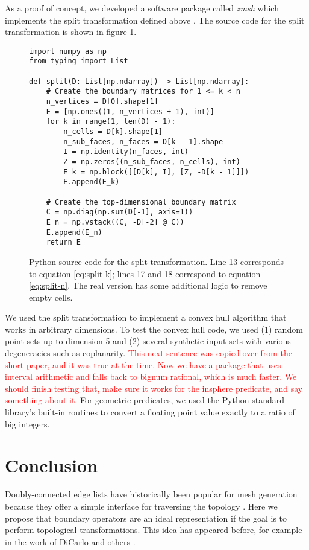 \documentclass[twocolumn]{article}
\begin{document}
As a proof of concept, we developed a software package called \emph{zmsh} which implements the split transformation defined above \cite{shapero2023zmsh}.
The source code for the split transformation is shown in figure \ref{fig:split-source-code}.
\begin{figure}
    \begin{verbatim}
import numpy as np
from typing import List

def split(D: List[np.ndarray]) -> List[np.ndarray]:
    # Create the boundary matrices for 1 <= k < n
    n_vertices = D[0].shape[1]
    E = [np.ones((1, n_vertices + 1), int)]
    for k in range(1, len(D) - 1):
        n_cells = D[k].shape[1]
        n_sub_faces, n_faces = D[k - 1].shape
        I = np.identity(n_faces, int)
        Z = np.zeros((n_sub_faces, n_cells), int)
        E_k = np.block([[D[k], I], [Z, -D[k - 1]]])
        E.append(E_k)

    # Create the top-dimensional boundary matrix
    C = np.diag(np.sum(D[-1], axis=1))
    E_n = np.vstack((C, -D[-2] @ C))
    E.append(E_n)
    return E
    \end{verbatim}
    \caption{Python source code for the split transformation.
    Line 13 corresponds to equation \eqref{eq:split-k}; lines 17 and 18 correspond to equation \eqref{eq:split-n}.
    The real version has some additional logic to remove empty cells.}
    \label{fig:split-source-code}
\end{figure}
We used the split transformation to implement a convex hull algorithm that works in arbitrary dimensions.
To test the convex hull code, we used (1) random point sets up to dimension 5 and (2) several synthetic input sets with various degeneracies such as coplanarity.
\textcolor{red}{This next sentence was copied over from the short paper, and it was true at the time.
Now we have a package that uses interval arithmetic and falls back to bignum rational, which is much faster.
We should finish testing that, make sure it works for the insphere predicate, and say something about it.}
For geometric predicates, we used the Python standard library's built-in routines to convert a floating point value exactly to a ratio of big integers.


\section{Conclusion}

Doubly-connected edge lists have historically been popular for mesh generation because they offer a simple interface for traversing the topology \cite{guibas1985primitives}.
Here we propose that boundary operators are an ideal representation if the goal is to perform topological transformations.
This idea has appeared before, for example in the work of DiCarlo and others \cite{dicarlo2007solid}.
\end{document}
